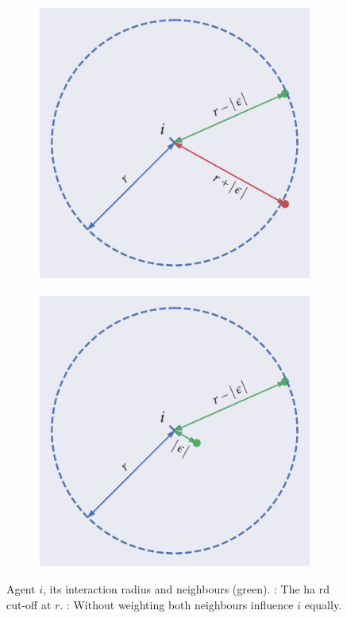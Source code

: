 \begin{figure}[!tbp]
	\begin{subfigure}[b]{0.45\textwidth}
		\includegraphics{no_interact.pdf}
		\caption{}
		\label{subfig:no_interact}
	\end{subfigure}%
	\hspace{0.05\textwidth}
	\begin{subfigure}[b]{0.45\textwidth}
		\includegraphics{interact.pdf}
		\caption{}
		\label{subfig:interact}
	\end{subfigure}
	\caption{Agent $i$, its interaction radius and neighbours (green). : The ha
rd cut-off at $r$. : Without weighting both neighbours influence $i$ equally.}
\end{figure}

